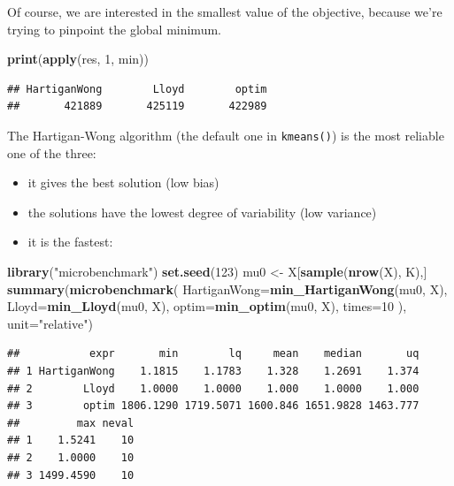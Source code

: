 \documentclass[10pt,b5paper,krantz1]{krantz}
\newenvironment{Shaded}{\begin{snugshade}}{\end{snugshade}}
\newcommand{\DataTypeTok}[1]{\textcolor[rgb]{0.27,0.27,0.27}{#1}}
\newcommand{\DecValTok}[1]{\textcolor[rgb]{0.06,0.06,0.06}{#1}}
\newcommand{\KeywordTok}[1]{\textcolor[rgb]{0.27,0.27,0.27}{\textbf{#1}}}
\newcommand{\NormalTok}[1]{#1}
\newcommand{\StringTok}[1]{\textcolor[rgb]{0.5,0.5,0.5}{#1}}
\providecommand{\tightlist}{%
  \setlength{\itemsep}{0pt}\setlength{\parskip}{0pt}}
\begin{document}
Of course, we are interested in the smallest value of the objective,
because we're trying to pinpoint the global minimum.

\begin{Shaded}
\begin{Highlighting}[]
\KeywordTok{print}\NormalTok{(}\KeywordTok{apply}\NormalTok{(res, }\DecValTok{1}\NormalTok{, min))}
\end{Highlighting}
\end{Shaded}

\begin{verbatim}
## HartiganWong        Lloyd        optim 
##       421889       425119       422989
\end{verbatim}

The Hartigan-Wong algorithm (the default one in \texttt{kmeans()})
is the most reliable one of the three:

\begin{itemize}
\tightlist
\item
  it gives the best solution (low bias)
\item
  the solutions have the lowest degree of variability (low variance)
\item
  it is the fastest:
\end{itemize}

\begin{Shaded}
\begin{Highlighting}[]
\KeywordTok{library}\NormalTok{(}\StringTok{"microbenchmark"}\NormalTok{)}
\KeywordTok{set.seed}\NormalTok{(}\DecValTok{123}\NormalTok{)}
\NormalTok{mu0 <-}\StringTok{ }\NormalTok{X[}\KeywordTok{sample}\NormalTok{(}\KeywordTok{nrow}\NormalTok{(X), K),]}
\KeywordTok{summary}\NormalTok{(}\KeywordTok{microbenchmark}\NormalTok{(}
    \DataTypeTok{HartiganWong=}\KeywordTok{min_HartiganWong}\NormalTok{(mu0, X),}
    \DataTypeTok{Lloyd=}\KeywordTok{min_Lloyd}\NormalTok{(mu0, X),}
    \DataTypeTok{optim=}\KeywordTok{min_optim}\NormalTok{(mu0, X),}
    \DataTypeTok{times=}\DecValTok{10}
\NormalTok{), }\DataTypeTok{unit=}\StringTok{"relative"}\NormalTok{)}
\end{Highlighting}
\end{Shaded}

\begin{verbatim}
##           expr       min        lq     mean    median       uq
## 1 HartiganWong    1.1815    1.1783    1.328    1.2691    1.374
## 2        Lloyd    1.0000    1.0000    1.000    1.0000    1.000
## 3        optim 1806.1290 1719.5071 1600.846 1651.9828 1463.777
##         max neval
## 1    1.5241    10
## 2    1.0000    10
## 3 1499.4590    10
\end{verbatim}
\end{document}
